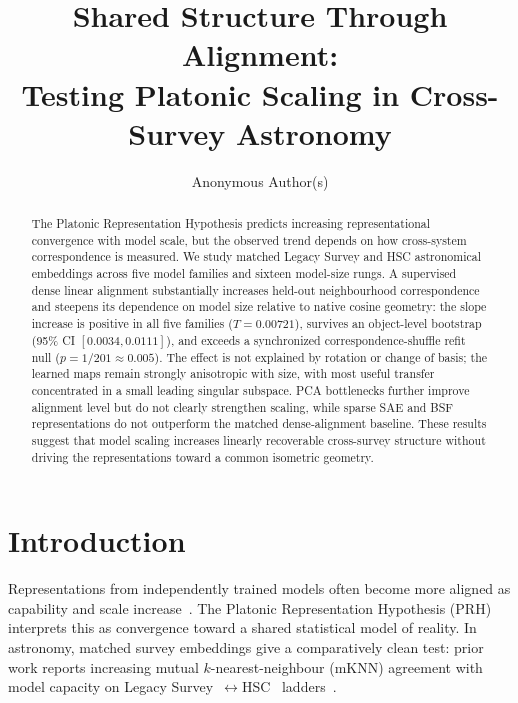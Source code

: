 \documentclass{article}
\title{Shared Structure Through Alignment:\\
Testing Platonic Scaling in Cross-Survey Astronomy}
\author{Anonymous Author(s)}
\begin{document}
\maketitle

\begin{abstract}
The Platonic Representation Hypothesis predicts increasing representational convergence with model scale, but the observed trend depends on how cross-system correspondence is measured.
We study matched Legacy Survey and HSC astronomical embeddings across five model families and sixteen model-size rungs.
A supervised dense linear alignment substantially increases held-out neighbourhood correspondence and steepens its dependence on model size relative to native cosine geometry: the slope increase is positive in all five families (\(T{=}0.00721\)), survives an object-level bootstrap (95\% CI \([0.0034,0.0111]\)), and exceeds a synchronized correspondence-shuffle refit null (\(p{=}1/201\approx0.005\)).
The effect is not explained by rotation or change of basis; the learned maps remain strongly anisotropic with size, with most useful transfer concentrated in a small leading singular subspace.
PCA bottlenecks further improve alignment level but do not clearly strengthen scaling, while sparse SAE and BSF representations do not outperform the matched dense-alignment baseline.
These results suggest that model scaling increases linearly recoverable cross-survey structure without driving the representations toward a common isometric geometry.
\end{abstract}

\section{Introduction}
\label{sec:intro}

Representations from independently trained models often become more aligned as capability and scale increase~\citep{huh2024platonic}.
The Platonic Representation Hypothesis (PRH) interprets this as convergence toward a shared statistical model of reality.
In astronomy, matched survey embeddings give a comparatively clean test: prior work reports increasing mutual \(k\)-nearest-neighbour (mKNN) agreement with model capacity on Legacy Survey~\citep{dey2019legacy}\(\leftrightarrow\)HSC~\citep{miyazaki2018hsc} ladders~\citep{duraphe2025platonicuniverse}.
\end{document}
